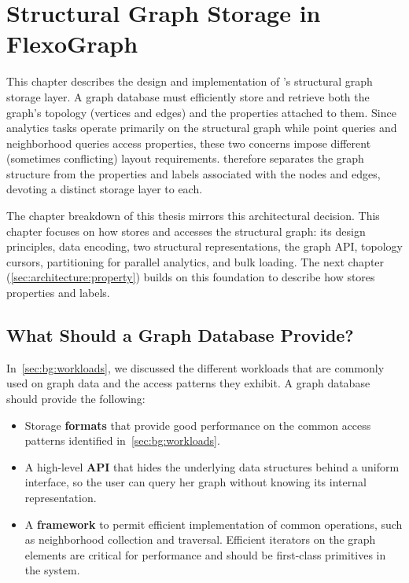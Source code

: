 \chapter{Structural Graph Storage in FlexoGraph}
\label{sec:architecture:structural}

This chapter describes the design and implementation of \project{}'s structural graph storage layer.
A graph database must efficiently store and retrieve both the graph's topology (vertices and edges) and the properties attached to them.
Since analytics tasks operate primarily on the structural graph while point queries and neighborhood queries access properties, these two concerns impose different (sometimes conflicting) layout requirements.
\project{} therefore separates the graph structure from the properties and labels associated with the nodes and edges, devoting a distinct storage layer to each.

The chapter breakdown of this thesis mirrors this architectural decision.
This chapter focuses on how \project{} stores and accesses the structural graph: its design principles, data encoding, two structural representations, the graph API, topology cursors, partitioning for parallel analytics, and bulk loading.
The next chapter (\autoref{sec:architecture:property}) builds on this foundation to describe how \project{} stores properties and labels.

\section{What Should a Graph Database Provide?}
\label{arch:requirements}

In~\autoref{sec:bg:workloads}, we discussed the different workloads that are commonly used on graph data and the access patterns they exhibit.
A graph database should provide the following:
\begin{itemize}
\item Storage \textbf{formats} that provide good performance on the common access patterns identified in~\autoref{sec:bg:workloads}.
\item A high-level \textbf{API} that hides the underlying data structures behind a uniform interface, so the user can query her graph without knowing its internal representation.
\item A \textbf{framework} to permit efficient implementation of common operations, such as neighborhood collection and traversal. Efficient iterators on the graph elements are critical for performance and should be first-class primitives in the system.
\end{itemize}


